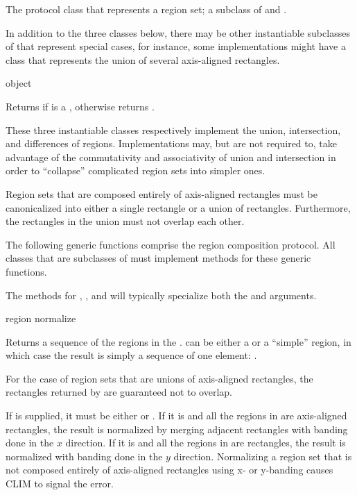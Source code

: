 
The protocol class that represents a region set; a subclass of  and
.

In addition to the three classes below, there may be other instantiable
subclasses of  that represent special cases, for instance, some
implementations might have a  class that represents
the union of several axis-aligned rectangles.

\Immutable

 {object}

Returns  if  is a , otherwise returns
.


These three instantiable classes respectively implement the union, intersection,
and differences of regions.  Implementations may, but are not required to, take
advantage of the commutativity and associativity of union and intersection in
order to ``collapse'' complicated region sets into simpler ones.

Region sets that are composed entirely of axis-aligned rectangles must be
canonicalized into either a single rectangle or a union of rectangles.
Furthermore, the rectangles in the union must not overlap each other.


The following generic functions comprise the region composition protocol.  All
classes that are subclasses of  must implement methods for these
generic functions.

The methods for , , and
 will typically specialize both the  and
 arguments.


 {region \key normalize}

Returns a sequence of the regions in the  .
 can be either a  or a ``simple'' region, in which
case the result is simply a sequence of one element: .
\ReadOnly

For the case of region sets that are unions of axis-aligned rectangles, the
rectangles returned by  are guaranteed not to overlap.

If  is supplied, it must be either  or
.  If it is  and all the regions in 
are axis-aligned rectangles, the result is normalized by merging adjacent
rectangles with banding done in the $x$ direction.  If it is  and
all the regions in  are rectangles, the result is normalized with
banding done in the $y$ direction.  Normalizing a region set that is not
composed entirely of axis-aligned rectangles using x- or y-banding causes CLIM
to signal the  error.

